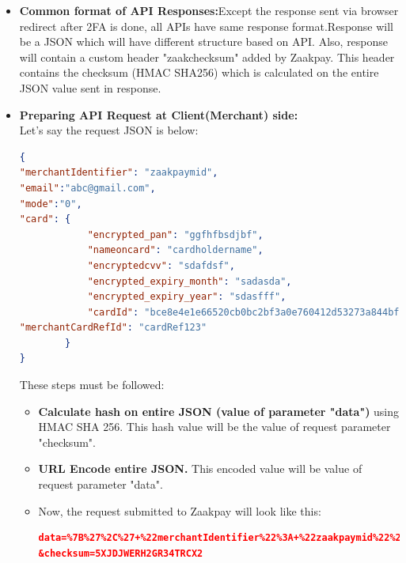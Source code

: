 \documentclass{article}
\begin{document}
\begin{itemize}
\item {\bfseries Common format of API Responses:}Except the response sent via browser redirect after 2FA is done, all APIs have same response format.Response will be a JSON  which will have different structure based on API. Also, response will contain a custom header "zaakchecksum" added by Zaakpay. This header contains the checksum (HMAC SHA­256) which is calculated on the entire JSON value sent in response.  
\item {\bfseries Preparing API Request at Client(Merchant) side:} \\
Let’s say the request JSON is below: 
\begin{lstlisting}[language=json,breaklines=true]
{ 
"merchantIdentifier": "zaakpaymid", 
"email":"abc@gmail.com", 
"mode":"0", 
"card": { 
            "encrypted_pan": "ggfhfbsdjbf", 
            "nameoncard": "cardholdername", 
            "encryptedcvv": "sdafdsf", 
            "encrypted_expiry_month": "sadasda", 
            "encrypted_expiry_year": "sdasfff", 
            "cardId": "bce8e4e1e66520cb0bc2bf3a0e760412d53273a844bf0931f2b3136a2ee0ada3~1", 
"merchantCardRefId": "cardRef123" 
        } 
} 
\end{lstlisting}
These steps must be followed: 
\begin{itemize}
\item {\bfseries Calculate   hash   on   entire   JSON   (value   of   parameter "data")}   using   HMAC   SHA   256.   This   hash   value  
will be the value of request parameter "checksum". 
\item {\bfseries URL Encode entire JSON. } This encoded value will be value of request parameter "data".
\item Now, the request submitted to Zaakpay will look like this: 
 \begin{lstlisting}[language=json,breaklines=true]
data=%7B%27%2C%27+%22merchantIdentifier%22%3A+%22zaakpaymid%22%2C%27%2C%27+%22email%22%3A%22abc%40gmail.com%22%2C%27%2C%27+%22mode%22%3A%220%22%2C%27%2C%27+%22card%22%3A+%7B%27%2C%27+%22encrypted_pan%22%3A+%22ggfhfbsdjbf%22%2C%27%2C%27+%22nameoncard%22%3A+%22cardholdername%22%2C%27%2C%27+%22encryptedcvv%22%3A+%22sdafdsf%22%2C%27%2C%27+%22encrypted_expiry_month%22%3A+%22sadasda%22%2C%27%2C%27+%22encrypted_expiry_year%22%3A+%22sdasfff%22%2C%27%2C%27+%22cardId%22%3A+%22bce8e4e1e66520cb 0bc2bf3a0e760412d53273a844bf0931f2b3136a2ee0ada3%7E1%22%2C%27%2C%27%22merchantCardRefId%22%3A+%22cardRef123%22%27%2C%27+%7D%27%2C%27%7D
&checksum=5XJDJWERH2GR34TRCX2
\end{lstlisting}

\end{itemize}
\end{itemize}
\end{document}
